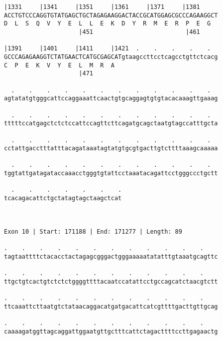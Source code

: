 \documentclass{article}
\begin{document}
\begin{Verbatim}
|1331     |1341     |1351     |1361     |1371     |1381     
ACCTGTCCCAGGTGTATGAGCTGCTAGAGAAGGACTACCGCATGGAGCGCCCAGAAGGCT
D  L  S  Q  V  Y  E  L  L  E  K  D  Y  R  M  E  R  P  E  G  
                     |451                          |461     
  
|1391     |1401     |1411     |1421  .    .    .    .    .  
GCCCAGAGAAGGTCTATGAACTCATGCGAGCATgtaagccttcctcagcctgttctcacg
C  P  E  K  V  Y  E  L  M  R  A                             
                     |471                                   
  
  .    .    .    .    .    .    .    .    .    .    .    .  
agtatatgtgggcattccaggaaattcaactgtgcaggagtgtgtacacaaagttgaaag
                                                            
  .    .    .    .    .    .    .    .    .    .    .    .  
tttttccatgagctctctccattccagttcttcagatgcagctaatgtagccatttgcta
                                                            
  .    .    .    .    .    .    .    .    .    .    .    .  
cctattgacctttatttacagataaatagtatgtgcgtgacttgtcttttaaagcaaaaa
                                                            
  .    .    .    .    .    .    .    .    .    .    .    .  
tggtattgatagataccaaacctgggtgtattcctaaatacagattcctgggccctgctt
                                                            
  .    .    .    .    .    .    .
tcacagacattctgctatagtagctaagctcat
                                 
                                 
 
Exon 10 | Start: 171188 | End: 171277 | Length: 89
 
.    .    .    .    .    .    .    .    .    .    .    .    
tagtaattttctacacctactagagcgggactgggaaaaatatatttgtaaatgcagttc
                                                            
.    .    .    .    .    .    .    .    .    .    .    .    
ttgctgtcactgtctctctggggttttacaatccatattcctgccagcatctaacgtctt
                                                            
.    .    .    .    .    .    .    .    .    .    .    .    
ttcaaattcttaatgtctataacaggacatgatgacattcatcgttttgacttgttgcag
                                                            
.    .    .    .    .    .    .    .    .    .    .    .    
caaaagatggttagcaggattggaatgttgctttcattctagacttttccttgagaactg
                                                            

\end{Verbatim}
\end{document}
